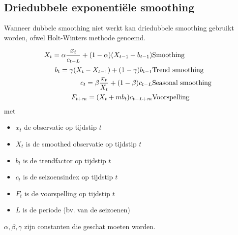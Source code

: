 \subsection{Driedubbele exponenti\"ele smoothing}
Wanneer dubbele smoothing niet werkt kan driedubbele smoothing gebruikt worden, ofwel Holt-Winters methode genoemd.

\begin{eqnarray}
	X_{t} = \alpha \frac{x_{t}}{c_{t-L}} + (1-\alpha) (X_{t-1} + b_{t-1}) & \textnormal{Smoothing}\\
	b_{t} = \gamma (X_{t} - X_{t-1}) + (1-\gamma)b_{t-1} & \textnormal{Trend smoothing} \\
	c_{t} = \beta \frac{x_{t}}{X_{t}} + (1-\beta)c_{t-L} & \textnormal{Seasonal smoothing} \\
	F_{t+m} = (X_{t} + mb_{t})c_{t-L+m} & \textnormal{Voorspelling}
\label{eq:HoltWinters}
\end{eqnarray}
 met 
\begin{itemize}
	\item $x_{t}$ de observatie op tijdstip $t$
	\item $X_{t}$ is de smoothed observatie op tijdstip $t$
	\item $b_{t}$ is de trendfactor op tijdstip $t$
	\item $c_{t}$ is de seizoensindex op tijdstip $t$
	\item $F_{t}$ is de voorspelling op tijdstip $t$
	\item $L$ is de periode (bv. van de seizoenen)
\end{itemize}

$\alpha, \beta, \gamma$ zijn constanten die geschat moeten worden. 
